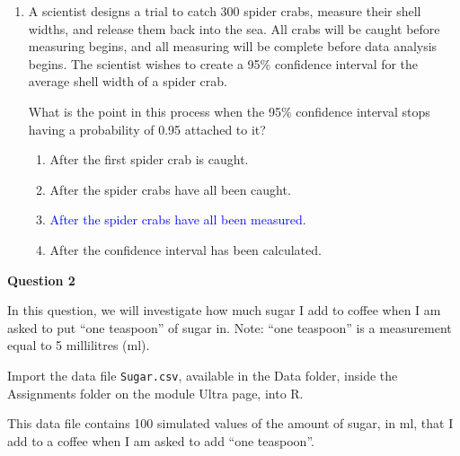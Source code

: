 \documentclass[11pt,a4paper]{article}
\begin{document}
\begin{enumerate}
\item A scientist designs a trial to catch 300 spider crabs, measure their shell widths, and release them back into the sea. All crabs will be caught before measuring begins, and all measuring will be complete before data analysis begins. The scientist wishes to create a 95\% confidence interval for the average shell width of a spider crab. 

What is the point in this process when the 95\% confidence interval stops having a probability of 0.95 attached to it?
\begin{enumerate}
\item After the first spider crab is caught.
\item After the spider crabs have all been caught.
\item \textcolor{blue}{After the spider crabs have all been measured.}
\item After the confidence interval has been calculated.
\end{enumerate}

\end{enumerate}

\textbf{Question 2}
\vspace{0.2cm}

In this question, we will investigate how much sugar I add to coffee when I am asked to put ``one teaspoon'' of sugar in. Note: ``one teaspoon'' is a measurement equal to 5 millilitres (ml).

Import the data file \texttt{Sugar.csv}, available in the Data folder, inside the Assignments folder on the module Ultra page, into R.

This data file contains 100 simulated values of the amount of sugar, in ml, that I add to a coffee when I am asked to add ``one teaspoon''.
\end{document}
